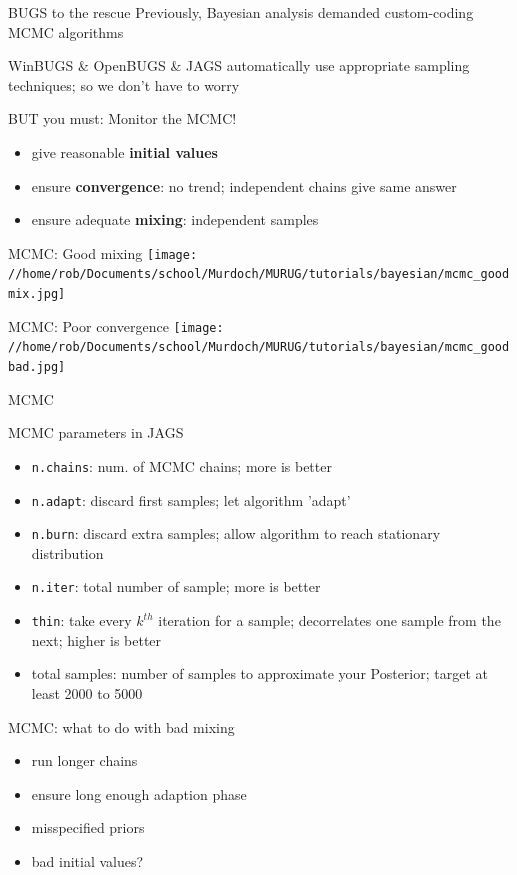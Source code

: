 \documentclass[presentation,9pt,xcolor=dvipsnames]{beamer}
\begin{document}
\begin{frame}[label={sec:orgc13a934}]{BUGS to the rescue}
Previously, Bayesian analysis demanded custom-coding MCMC algorithms
\begin{block}{WinBUGS \& OpenBUGS \& JAGS}
automatically use appropriate sampling techniques; so we don't have to worry
\end{block}
\begin{block}{BUT you must: Monitor the MCMC!}
\begin{itemize}
\item give reasonable \textbf{initial values}
\item ensure \textbf{convergence}: no trend; independent chains give same answer
\item ensure adequate \textbf{mixing}: independent samples
\end{itemize}
\end{block}
\end{frame}
\begin{frame}[label={sec:org8ded438}]{MCMC: Good mixing}
\texttt{[image: //home/rob/Documents/school/Murdoch/MURUG/tutorials/bayesian/mcmc\_goodmix.jpg]}
\end{frame}
\begin{frame}[label={sec:orgc065cda}]{MCMC: Poor convergence}
\texttt{[image: //home/rob/Documents/school/Murdoch/MURUG/tutorials/bayesian/mcmc\_goodbad.jpg]}
\end{frame}
\begin{frame}[fragile,label={sec:org98338ed}]{MCMC}
 \begin{block}{MCMC parameters in JAGS}
\begin{itemize}
\item \texttt{n.chains}: num. of MCMC chains; more is better
\item \texttt{n.adapt}: discard first samples; let algorithm 'adapt'
\item \texttt{n.burn}: discard extra samples; allow algorithm to reach stationary distribution
\item \texttt{n.iter}: total number of sample; more is better
\item \texttt{thin}: take every \(k^{th}\) iteration for a sample; decorrelates one sample from the next; higher is better
\item total samples: number of samples to approximate your Posterior; target at least 2000 to 5000
\end{itemize}
\end{block}
\end{frame}
\begin{frame}[label={sec:org05a3aab}]{MCMC: what to do with bad mixing}
\begin{itemize}
\item run longer chains
\item ensure long enough adaption phase
\item misspecified priors
\item bad initial values?
\end{itemize}
\end{frame}
\end{document}
